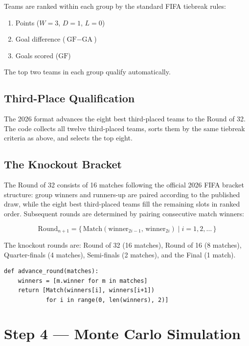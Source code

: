 \documentclass[12pt,a4paper]{article}
\begin{document}
Teams are ranked within each group by the standard FIFA tiebreak rules:

\begin{enumerate}[noitemsep]
  \item Points ($W = 3$, $D = 1$, $L = 0$)
  \item Goal difference ($\text{GF} - \text{GA}$)
  \item Goals scored ($\text{GF}$)
\end{enumerate}

The top two teams in each group qualify automatically.

\subsection{Third-Place Qualification}

The 2026 format advances the eight best third-placed teams to the
Round of 32.  The code collects all twelve third-placed teams, sorts them
by the same tiebreak criteria as above, and selects the top eight.

\subsection{The Knockout Bracket}

The Round of 32 consists of 16 matches following the official 2026 FIFA
bracket structure: group winners and runners-up are paired according to
the published draw, while the eight best third-placed teams fill the
remaining slots in ranked order.  Subsequent rounds are determined by
pairing consecutive match winners:

\[
  \text{Round}_{n+1} = \bigl\{\,
    \text{Match}(\text{winner}_{2i-1},\, \text{winner}_{2i})
    \mid i = 1, 2, \ldots
  \,\bigr\}
\]

The knockout rounds are: Round of 32 (16 matches), Round of 16
(8 matches), Quarter-finals (4 matches), Semi-finals (2 matches),
and the Final (1 match).

\begin{lstlisting}
def advance_round(matches):
    winners = [m.winner for m in matches]
    return [Match(winners[i], winners[i+1])
            for i in range(0, len(winners), 2)]
\end{lstlisting}

\section{Step 4 --- Monte Carlo Simulation}
\label{sec:montecarlo}
\end{document}
